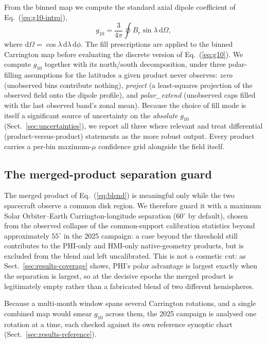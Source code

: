 \documentclass{aa}
\begin{document}
From the binned map we compute the standard axial dipole coefficient of Eq.~(\ref{eq:g10-intro}),
\begin{equation}
    g_{10} = \frac{3}{4\pi} \oint B_r \sin\lambda \, \mathrm{d}\Omega,
    \label{eq:g10}
\end{equation}
where $\mathrm{d}\Omega = \cos\lambda\,\mathrm{d}\lambda\,\mathrm{d}\phi$. The fill prescriptions are applied to the binned Carrington map before evaluating the discrete version of Eq.~(\ref{eq:g10}). We compute $g_{10}$ together with its north/south decomposition, under three polar-filling assumptions for the latitudes a given product never observes: \emph{zero} (unobserved bins contribute nothing), \emph{project} (a least-squares projection of the observed field onto the dipole profile), and \emph{polar\_extend} (unobserved caps filled with the last observed band's zonal mean). Because the choice of fill mode is itself a significant source of uncertainty on the \emph{absolute} $g_{10}$ (Sect.~\ref{sec:uncertainties}), we report all three where relevant and treat differential (product-versus-product) statements as the more robust output. Every product carries a per-bin maximum-$\mu$ confidence grid alongside the field itself.

\subsection{The merged-product separation guard}
\label{sec:methods-guard}

The merged product of Eq.~(\ref{eq:blend}) is meaningful only while the two spacecraft observe a common disk region. We therefore guard it with a maximum Solar Orbiter--Earth Carrington-longitude separation (60$^{\circ}$ by default), chosen from the observed collapse of the common-support calibration statistics beyond approximately $55^{\circ}$ in the 2025 campaign: a case beyond the threshold still contributes to the PHI-only and HMI-only native-geometry products, but is excluded from the blend and left uncalibrated. This is not a cosmetic cut: as Sect.~\ref{sec:results-coverage} shows, PHI's polar advantage is largest exactly when the separation is largest, so at the decisive epochs the merged product is legitimately empty rather than a fabricated blend of two different hemispheres.

Because a multi-month window spans several Carrington rotations, and a single combined map would smear $g_{10}$ across them, the 2025 campaign is analysed one rotation at a time, each checked against its own reference synoptic chart (Sect.~\ref{sec:results-reference}).
\end{document}
